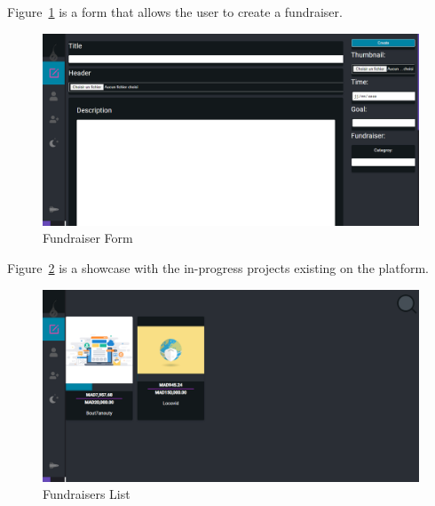 
Figure~\ref{fig:fundraiser form} is a form that allows the user to create a fundraiser.

\begin{figure}[H]
      \centering
      \includegraphics[scale=0.45]{assets/screen-fundraiser-creator.png}
      \caption{Fundraiser Form}
      \label{fig:fundraiser form}
\end{figure}



Figure~\ref{fig:fundraisers list} is a showcase with the in-progress projects existing on the platform.
\begin{figure}[H]
      \centering
      \includegraphics[scale=0.45]{assets/screen-fundraisers-list.png}
      \caption{Fundraisers List}
      \label{fig:fundraisers list}
\end{figure}




